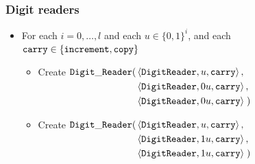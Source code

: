     \subsubsection{ Digit readers }
        \begin{itemize}
            \item For each $i = 0,\ldots,l$ and each $u \in \{0, 1\}^i$, and
                  each ${\tt carry} \in \{{\tt increment}, {\tt copy} \}$

                \begin{itemize}
                \item Create
                    $\begin{aligned}[t]
                        {\tt Digit\_Reader}(& \left\langle {\tt DigitReader}, u, {\tt carry} \right\rangle, \\
                                 & \left\langle {\tt DigitReader}, 0u, {\tt carry} \right\rangle, \\
                                 & \left\langle {\tt DigitReader}, 0u, {\tt carry} \right\rangle \;)
                    \end{aligned}$

                \item Create
                $\begin{aligned}[t]
                    {\tt Digit\_Reader}(& \left\langle {\tt DigitReader}, u,  {\tt carry} \right\rangle, \\
                             & \left\langle {\tt DigitReader}, 1u, {\tt carry} \right\rangle, \\
                             & \left\langle {\tt DigitReader}, 1u, {\tt carry} \right\rangle \;)
                \end{aligned}$
                \end{itemize}
            \vspace{.5cm}


        \end{itemize}

